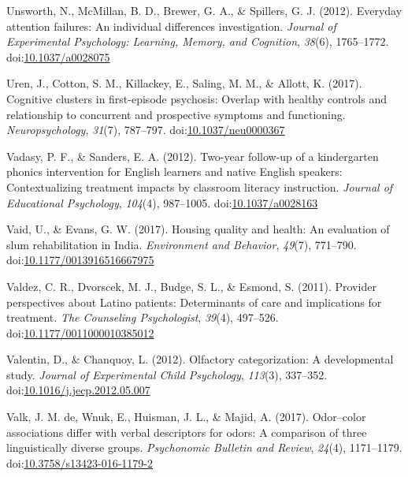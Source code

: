 \documentclass[english,man]{apa6}
\begin{document}
\hypertarget{ref-Unsworth2012}{}
Unsworth, N., McMillan, B. D., Brewer, G. A., \& Spillers, G. J. (2012).
Everyday attention failures: An individual differences investigation.
\emph{Journal of Experimental Psychology: Learning, Memory, and
Cognition}, \emph{38}(6), 1765--1772.
doi:\href{https://doi.org/10.1037/a0028075}{10.1037/a0028075}

\hypertarget{ref-Uren2017}{}
Uren, J., Cotton, S. M., Killackey, E., Saling, M. M., \& Allott, K.
(2017). Cognitive clusters in first-episode psychosis: Overlap with
healthy controls and relationship to concurrent and prospective symptoms
and functioning. \emph{Neuropsychology}, \emph{31}(7), 787--797.
doi:\href{https://doi.org/10.1037/neu0000367}{10.1037/neu0000367}

\hypertarget{ref-Vadasy2012}{}
Vadasy, P. F., \& Sanders, E. A. (2012). Two-year follow-up of a
kindergarten phonics intervention for English learners and native
English speakers: Contextualizing treatment impacts by classroom
literacy instruction. \emph{Journal of Educational Psychology},
\emph{104}(4), 987--1005.
doi:\href{https://doi.org/10.1037/a0028163}{10.1037/a0028163}

\hypertarget{ref-Vaid2017}{}
Vaid, U., \& Evans, G. W. (2017). Housing quality and health: An
evaluation of slum rehabilitation in India. \emph{Environment and
Behavior}, \emph{49}(7), 771--790.
doi:\href{https://doi.org/10.1177/0013916516667975}{10.1177/0013916516667975}

\hypertarget{ref-Valdez2011}{}
Valdez, C. R., Dvorscek, M. J., Budge, S. L., \& Esmond, S. (2011).
Provider perspectives about Latino patients: Determinants of care and
implications for treatment. \emph{The Counseling Psychologist},
\emph{39}(4), 497--526.
doi:\href{https://doi.org/10.1177/0011000010385012}{10.1177/0011000010385012}

\hypertarget{ref-Valentin2012}{}
Valentin, D., \& Chanquoy, L. (2012). Olfactory categorization: A
developmental study. \emph{Journal of Experimental Child Psychology},
\emph{113}(3), 337--352.
doi:\href{https://doi.org/10.1016/j.jecp.2012.05.007}{10.1016/j.jecp.2012.05.007}

\hypertarget{ref-DeValk2016}{}
Valk, J. M. de, Wnuk, E., Huisman, J. L., \& Majid, A. (2017).
Odor--color associations differ with verbal descriptors for odors: A
comparison of three linguistically diverse groups. \emph{Psychonomic
Bulletin and Review}, \emph{24}(4), 1171--1179.
doi:\href{https://doi.org/10.3758/s13423-016-1179-2}{10.3758/s13423-016-1179-2}
\end{document}
